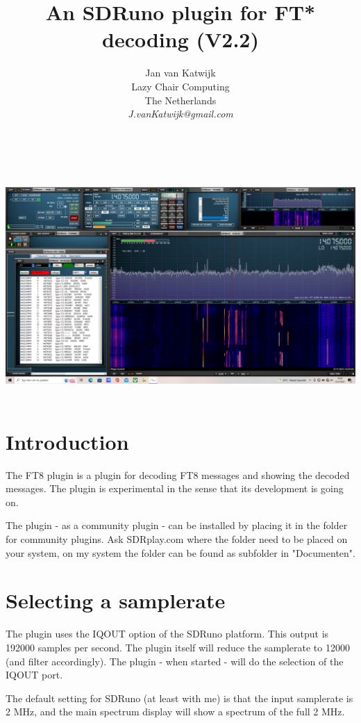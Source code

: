 \documentclass[11pt]{article}
\begin{document}
\title{An SDRuno plugin for FT* decoding (V2.2)}
\author{
Jan van Katwijk\\
Lazy Chair Computing \\
The Netherlands\\
{\em J.vanKatwijk@gmail.com}}
\maketitle
\ \\
\ \\
\includegraphics[width=150mm]{SDRunoPlugin_ft8.png}
\ \\
\section{Introduction}
The FT8 plugin is a plugin for decoding FT8 messages and
showing the decoded messages. The plugin is experimental in the sense
that its development is going on.
\par
The plugin - as a community plugin - can be installed by placing it
in the folder for community plugins. Ask SDRplay.com where the folder 
need to be placed on your system, on my system the folder can be found as
subfolder in "Documenten".

\section{Selecting a samplerate}
The plugin uses the IQOUT option of the SDRuno platform. This
output is 192000 samples per second. The plugin itself will reduce
the samplerate to 12000 (and filter accordingly).
The plugin - when started - will do the selection of the IQOUT port.
\par
The default setting for SDRuno (at least with me) is that the input samplerate
is 2 MHz, and the main spectrum display will show a spectrum of the full 2 MHz.
\end{document}
